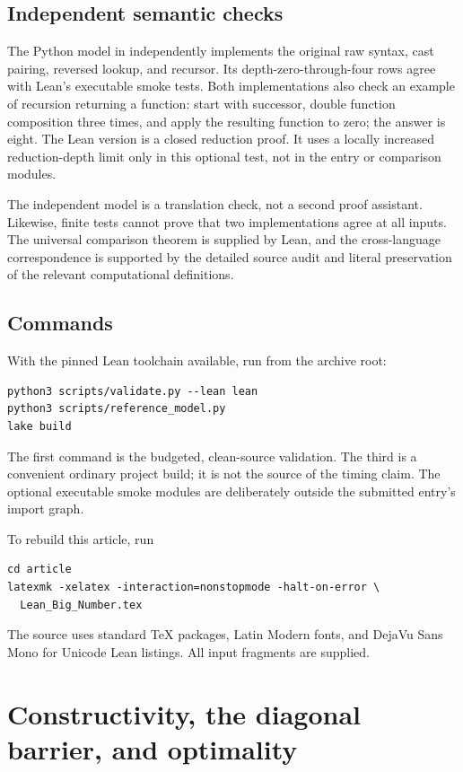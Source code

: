 \documentclass[11pt,letterpaper]{article}
\theoremstyle{definition}
\newcommand{\artifact}[1]{\texttt{\detokenize{#1}}}
\begin{document}
\subsection{Independent semantic checks}

The Python model in \artifact{scripts/reference_model.py} independently
implements the original raw syntax, cast pairing, reversed lookup, and
recursor. Its depth-zero-through-four rows agree with Lean's executable smoke
tests. Both implementations also check an example of recursion returning a
function: start with successor, double function composition three times, and
apply the resulting function to zero; the answer is eight. The Lean version
is a closed reduction proof. It uses a locally increased reduction-depth
limit only in this optional test, not in the entry or comparison modules.

The independent model is a translation check, not a second proof assistant.
Likewise, finite tests cannot prove that two implementations agree at all
inputs. The universal comparison theorem is supplied by Lean, and the
cross-language correspondence is supported by the detailed source audit and
literal preservation of the relevant computational definitions.

\subsection{Commands}

With the pinned Lean toolchain available, run from the archive root:
\begin{Verbatim}[frame=single,fontsize=\small,breaklines=true]
python3 scripts/validate.py --lean lean
python3 scripts/reference_model.py
lake build
\end{Verbatim}
The first command is the budgeted, clean-source validation. The third is a
convenient ordinary project build; it is not the source of the timing claim.
The optional executable smoke modules are deliberately outside the submitted
entry's import graph.

To rebuild this article, run
\begin{Verbatim}[frame=single,fontsize=\small]
cd article
latexmk -xelatex -interaction=nonstopmode -halt-on-error \
  Lean_Big_Number.tex
\end{Verbatim}
The source uses standard TeX packages, Latin Modern fonts, and DejaVu Sans Mono
for Unicode Lean listings. All input fragments are supplied.

\section{Constructivity, the diagonal barrier, and optimality}
\end{document}
